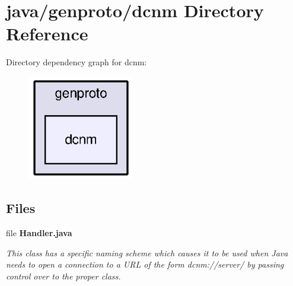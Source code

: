 \section{java/genproto/dcnm Directory Reference}
\label{dir_ae3b636822a08fbdb0f59ee3d581e8b9}
Directory dependency graph for dcnm\+:\nopagebreak
\begin{figure}[H]
\begin{center}
\leavevmode
\includegraphics[width=130pt]{dir_ae3b636822a08fbdb0f59ee3d581e8b9_dep}
\end{center}
\end{figure}
\subsection*{Files}
\begin{DoxyCompactItemize}
\item 
file {\bf Handler.\+java}
\begin{DoxyCompactList}\small\item\em This class has a specific naming scheme which causes it to be used when Java needs to open a connection to a U\+R\+L of the form dcnm\+://server/ by passing control over to the proper class. \end{DoxyCompactList}\end{DoxyCompactItemize}
